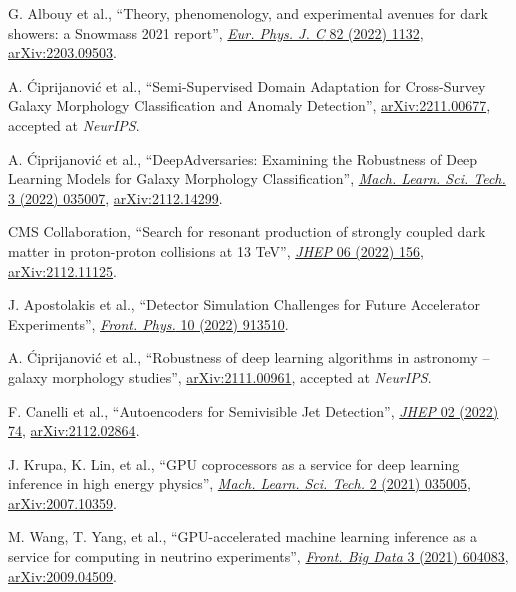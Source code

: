 \begin{description}[leftmargin=12pt,font=\normalfont,labelsep=0em]
\item G. Albouy et al., ``Theory, phenomenology, and experimental avenues for dark showers: a Snowmass 2021 report'', \href{https://doi.org/10.1140/epjc/s10052-022-11048-8}{\emph{Eur. Phys. J. C} 82 (2022) 1132}, \href{https://arxiv.org/abs/2203.09503}{arXiv:2203.09503}.
\ifdefined\longflag\item A. \'Ciprijanovi\'c et al., ``Semi-Supervised Domain Adaptation for Cross-Survey Galaxy Morphology Classification and Anomaly Detection'', \href{https://arxiv.org/abs/2211.00677}{arXiv:2211.00677}, accepted at \emph{NeurIPS}.\fi
\item A. \'Ciprijanovi\'c et al., ``DeepAdversaries: Examining the Robustness of Deep Learning Models for Galaxy Morphology Classification'', \href{https://doi.org/10.1088/2632-2153/ac7f1a}{\emph{Mach. Learn. Sci. Tech.} 3 (2022) 035007}, \href{https://arxiv.org/abs/2112.14299}{arXiv:2112.14299}.
\item CMS Collaboration, ``Search for resonant production of strongly coupled dark matter in proton-proton collisions at 13 TeV'', \href{https://doi.org/10.1007/JHEP06(2022)156}{\emph{JHEP} 06 (2022) 156}, \href{https://arxiv.org/abs/2112.11125}{arXiv:2112.11125}.
\item J. Apostolakis et al., ``Detector Simulation Challenges for Future Accelerator Experiments'', \href{https://doi.org/10.3389/fphy.2022.913510}{\emph{Front. Phys.} 10 (2022) 913510}.
\ifdefined\longflag\item A. \'Ciprijanovi\'c et al., ``Robustness of deep learning algorithms in astronomy -- galaxy morphology studies'', \href{https://arxiv.org/abs/2111.00961}{arXiv:2111.00961}, accepted at \emph{NeurIPS}. \fi
\item F. Canelli et al., ``Autoencoders for Semivisible Jet Detection'', \href{https://doi.org/10.1007/JHEP02(2022)074}{\emph{JHEP} 02 (2022) 74}, \href{https://arxiv.org/abs/2112.02864}{arXiv:2112.02864}.
\item J. Krupa, K. Lin, et al., ``GPU coprocessors as a service for deep learning inference in high energy physics'', \href{https://doi.org/10.1088/2632-2153/abec21}{\emph{Mach. Learn. Sci. Tech.} 2 (2021) 035005}, \href{https://arxiv.org/abs/2007.10359}{arXiv:2007.10359}.
\item M. Wang, T. Yang, et al., ``GPU-accelerated machine learning inference as a service for computing in neutrino experiments'', \href{https://doi.org/10.3389/fdata.2020.604083}{\emph{Front. Big Data} 3 (2021) 604083}, \href{https://arxiv.org/abs/2009.04509}{arXiv:2009.04509}.

\end{description}
